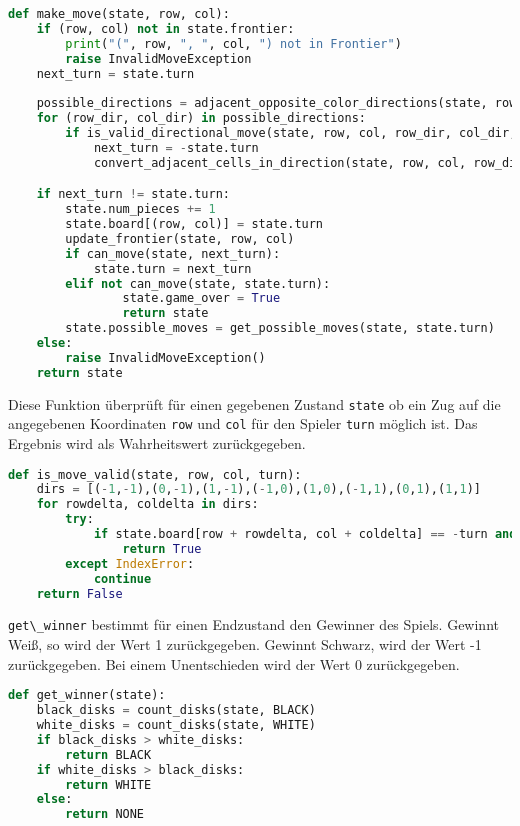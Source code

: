 \begin{lstlisting}[language=Python]
def make_move(state, row, col):
    if (row, col) not in state.frontier:
        print("(", row, ", ", col, ") not in Frontier")
        raise InvalidMoveException
    next_turn = state.turn
        
    possible_directions = adjacent_opposite_color_directions(state, row, col, state.turn)
    for (row_dir, col_dir) in possible_directions:
        if is_valid_directional_move(state, row, col, row_dir, col_dir, state.turn):
            next_turn = -state.turn
            convert_adjacent_cells_in_direction(state, row, col, row_dir, col_dir, state.turn)

    if next_turn != state.turn:
        state.num_pieces += 1
        state.board[(row, col)] = state.turn
        update_frontier(state, row, col)
        if can_move(state, next_turn):
            state.turn = next_turn
        elif not can_move(state, state.turn):
                state.game_over = True
                return state
        state.possible_moves = get_possible_moves(state, state.turn)
    else:
        raise InvalidMoveException()
    return state
\end{lstlisting}

Diese Funktion überprüft für einen gegebenen Zustand
\passthrough{\lstinline!state!} ob ein Zug auf die angegebenen
Koordinaten \passthrough{\lstinline!row!} und
\passthrough{\lstinline!col!} für den Spieler
\passthrough{\lstinline!turn!} möglich ist. Das Ergebnis wird als
Wahrheitswert zurückgegeben.

\begin{lstlisting}[language=Python]
def is_move_valid(state, row, col, turn):
    dirs = [(-1,-1),(0,-1),(1,-1),(-1,0),(1,0),(-1,1),(0,1),(1,1)]
    for rowdelta, coldelta in dirs:
        try:
            if state.board[row + rowdelta, col + coldelta] == -turn and is_valid_directional_move(state, row, col, rowdelta, coldelta, turn):
                return True
        except IndexError:
            continue
    return False
\end{lstlisting}

\passthrough{\lstinline!get\_winner!} bestimmt für einen Endzustand den
Gewinner des Spiels. Gewinnt Weiß, so wird der Wert 1 zurückgegeben.
Gewinnt Schwarz, wird der Wert -1 zurückgegeben. Bei einem Unentschieden
wird der Wert 0 zurückgegeben.

\begin{lstlisting}[language=Python]
def get_winner(state):
    black_disks = count_disks(state, BLACK)
    white_disks = count_disks(state, WHITE)
    if black_disks > white_disks:
        return BLACK
    if white_disks > black_disks:
        return WHITE
    else:
        return NONE
\end{lstlisting}

